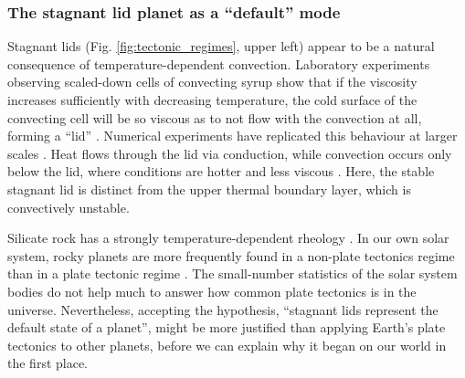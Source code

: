 





\subsubsection{The stagnant lid planet as a ``default'' mode}


Stagnant lids (Fig. \ref{fig:tectonic_regimes}, upper left) appear to be a natural consequence of temperature-dependent convection. Laboratory experiments observing scaled-down cells of convecting syrup show that if the viscosity increases sufficiently with decreasing temperature, the cold surface of the convecting cell will be so viscous as to not flow with the convection at all, forming a ``lid'' \citep{davaille_transient_1993, giannandrea_variable_1993}. Numerical experiments have replicated this behaviour at larger scales  \citep{solomatov_scaling_1995, moresi_numerical_1995, solomatov_can_1996}. Heat flows through the lid via conduction, while convection occurs only below the lid, where conditions are hotter and less viscous \citep{morris_boundarylayer_1984, christensen_convection_1984, hansen_high_1993, solomatov_scaling_1995}. Here, the stable stagnant lid is distinct from the upper thermal boundary layer, which is convectively unstable.

Silicate rock has a strongly temperature-dependent rheology \citep{karato_rheology_1993}. %
In our own solar system, rocky planets are more frequently found in a non-plate tectonics regime than in a plate tectonic regime \citep{stern_stagnant_2018}. %
The small-number statistics of the solar system bodies do not help much to answer how common plate tectonics is in the universe. Nevertheless, accepting the hypothesis, ``stagnant lids represent the default state of a planet'', might be more justified than applying Earth's plate tectonics to other planets, before we can explain why it began on our world in the first place. %





